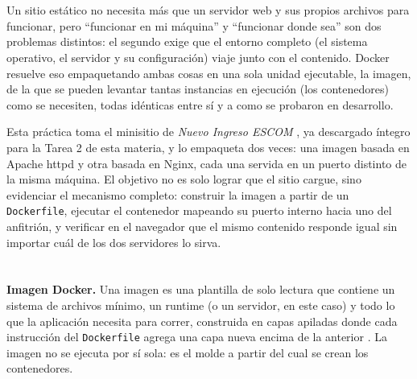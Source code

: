 \documentclass[10pt,a4paper]{article}
\begin{document}

\tableofcontents
\pagebreak
\listoffigures
\pagebreak
{}

\pagebreak

\section{\color{colorIPN}{Introducción}}

Un sitio estático no necesita más que un servidor web y sus propios archivos para funcionar, pero \enquote{funcionar en mi máquina} y \enquote{funcionar donde sea} son dos problemas distintos: el segundo exige que el entorno completo (el sistema operativo, el servidor y su configuración) viaje junto con el contenido. Docker resuelve eso empaquetando ambas cosas en una sola unidad ejecutable, la imagen, de la que se pueden levantar tantas instancias en ejecución (los contenedores) como se necesiten, todas idénticas entre sí y a como se probaron en desarrollo.

Esta práctica toma el minisitio de \emph{Nuevo Ingreso ESCOM} \cite{escom-nuevoingreso}, ya descargado íntegro para la Tarea 2 de esta materia, y lo empaqueta dos veces: una imagen basada en Apache httpd y otra basada en Nginx, cada una servida en un puerto distinto de la misma máquina. El objetivo no es solo lograr que el sitio cargue, sino evidenciar el mecanismo completo: construir la imagen a partir de un \texttt{Dockerfile}, ejecutar el contenedor mapeando su puerto interno hacia uno del anfitrión, y verificar en el navegador que el mismo contenido responde igual sin importar cuál de los dos servidores lo sirva.

\section{\color{colorIPN}{Conceptos teóricos}}

\textbf{Imagen Docker.} Una imagen es una plantilla de solo lectura que contiene un sistema de archivos mínimo, un runtime (o un servidor, en este caso) y todo lo que la aplicación necesita para correr, construida en capas apiladas donde cada instrucción del \texttt{Dockerfile} agrega una capa nueva encima de la anterior \cite{docker-overview}. La imagen no se ejecuta por sí sola: es el molde a partir del cual se crean los contenedores.
\end{document}
